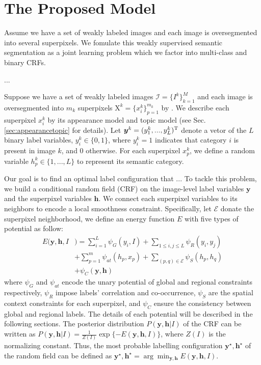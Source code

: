 
\section{The Proposed Model}
Assume we have a set of weakly labeled images and each image is oversegmented into several superpixels. 
We fomulate this weakly supervised semantic segmentation as a joint learning problem which we factor into multi-class and binary CRFs.

...

Suppose we have a set of weakly labeled images $\mathcal{I}=\{I^k\}_{k=1}^M$ and each image is oversegmented into $m_k$ superpixels $\mathrm{X}^k=\{x_i^k\}_{p=1}^{m_k}$ by \cite{arbelaez2014multiscale}.  We describe each superpixel $x_i^k$ by its appearance model and topic model (see Sec. \ref{sec:appearancetopic} for details). Let $\boldsymbol{y}^k = (y_1^k,...,y_L^k)^{\rm T}$ denote  a vetor of the $L$ binary label variables, \ie $y_i^k \in \{0,1\}$, where $y_i^k=1$ indicates that category $i$ is present in image $k$, and $0$ otherwise. For each superpixel $x_p^k$, we define a random variable $h_p^k \in \{1,...,L\}$ to represent its semantic category.


Our goal is to find an optimal label configuration that ... To tackle this problem, we build a conditional random field (CRF) on the image-level label variables $\boldsymbol{y}$ and the superpixel variables $\boldsymbol{h}$. We connect each superpixel variables to its neighbors to encode a local smoothness constraint. Specifically, let $\mathcal{E}$ donate the superpixel neighborhood, we define an energy function $E$ with five types of potential as follow:
\begin{equation}
    \label{eq:energyfunction}
    \begin{aligned}
        E(\boldsymbol{y},\boldsymbol{h},I&) = \sum_{i=1}^L{\psi_{G}(y_i,I)}
                            + \sum_{1 \le i,j \le L} {\psi_{R}(y_i,y_j)}\\ &+ \sum_{p=1}^{m}{\psi_{at}(h_p,x_p)}+ \sum_{(p,q) \in \mathcal{E}}{\psi_{S}(h_p,h_q)}\\ &+ \psi_{C}(\boldsymbol{y},\boldsymbol{h})
    \end{aligned}
\end{equation}
where $\psi_G$ and $\psi_{at}$ encode the unary potential of global and regional constraints respectively, $\psi_R$ impose labels' correlation and co-occurrence, $\psi_S$ are the spatial context constraints for each superpixel, and $\psi_C$ ensure the consistency between global and regional labels. The details of each potential will be described in the following sections. The posterior distribution $P(\boldsymbol{y},\boldsymbol{h}|I)$ of the CRF can be written as $P(\boldsymbol{y},\boldsymbol{h}|I) = \frac{1}{Z(I)}\exp{\{-E(\boldsymbol{y},\boldsymbol{h},I)\}}$, where $Z(I)$ is the normalizing constant. Thus, the most probable labelling configuration $\boldsymbol{y}^{\star},\boldsymbol{h}^{\star}$ of the random field can be defined as  $\boldsymbol{y}^{\star},\boldsymbol{h}^{\star} = \arg \min_{\boldsymbol{y},\boldsymbol{h}} E(\boldsymbol{y},\boldsymbol{h},I)$.

